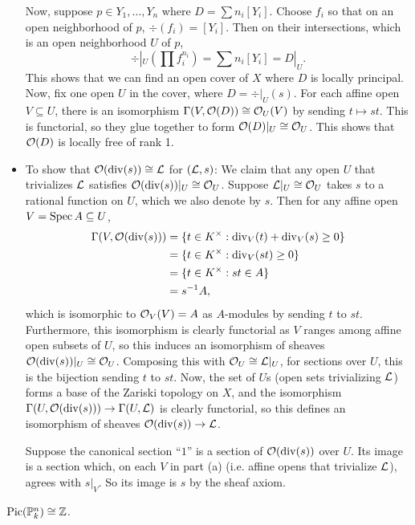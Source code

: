 \documentclass[11pt]{amsart}
\begin{document}
\begin{itemize}
Now, suppose $p\in Y_1,\dots,Y_n$ where $D  = \sum n_i[Y_i]$. Choose $f_i$ so that on an open neighborhood of $p$, $\div(f_i) = [Y_i]$. Then on their intersections, which is an open neighborhood $U$ of $p$, 
\[\div|_U (\prod f_i^{n_i}) = \sum n_i[Y_i] = D|_U.\]
This shows that we can find an open cover of $X$ where $D$ is locally principal. Now, fix one open $U$ in the cover, where $D = \div|_U(s)$. For each affine open $V\subseteq U$, there is an isomorphism $\Gamma(V,\mathcal{O}(D)) \cong \mathcal{O}_U(V)$ by sending $t\mapsto st$. This is functorial, so they glue together to form $\mathcal{O}(D)|_U \cong\mathcal{O}_U$. This shows that $\mathcal{O}(D)$ is locally free of rank 1.
\item To show that $\mathcal{O}(\operatorname{div}(s)) \cong \mathcal{L}$ for $(\mathcal{L}, s)$: We claim that any open $U$ that trivializes $\mathcal{L}$ satisfies $\mathcal{O}(\operatorname{div}(s))|_U \cong \mathcal{O}_U$. Suppose $\mathcal{L}|_U \cong \mathcal{O}_U$ takes $s$ to a rational function on $U$, which we also denote by $s$. Then for any affine open $V = \operatorname{Spec} A\subseteq U$,
    \begin{align*}
    \Gamma(V, \mathcal{O}(\operatorname{div}(s))) &= \{t\in K^\times: \operatorname{div}_V(t) + \operatorname{div}_V(s) \ge 0\} \\
    &= \{t\in K^\times: \operatorname{div}_V(st) \ge 0\} \\
    &= \{t\in K^\times: st\in A\} \\
    &= s^{-1}A,
    \end{align*}
    which is isomorphic to $\mathcal{O}_V(V) = A$ as $A$-modules by sending $t$ to $st$. Furthermore, this isomorphism is clearly functorial as $V$ ranges among affine open subsets of $U$, so this induces an isomorphism of sheaves $\mathcal{O}(\operatorname{div}(s))|_U \cong \mathcal{O}_U$. Composing this with $\mathcal{O}_U \cong \mathcal{L}|_U$, for sections over $U$, this is the bijection sending $t$ to $st$. Now, the set of $U$s (open sets trivializing $\mathcal{L}$) forms a base of the Zariski topology on $X$, and the isomorphism $\Gamma(U, \mathcal{O}(\operatorname{div}(s))) \to \Gamma(U, \mathcal{L})$ is clearly functorial, so this defines an isomorphism of sheaves $\mathcal{O}(\operatorname{div}(s))\to \mathcal{L}$.

    Suppose the canonical section ``$1$'' is a section of $\mathcal{O}(\operatorname{div}(s))$ over $U$. Its image is a section which, on each $V$ in part (a) (i.e. affine opens that trivialize $\mathcal{L}$), agrees with $s|_V$. So its image is $s$ by the sheaf axiom.
\end{itemize}


\begin{cor}
    $\operatorname{Pic}(\mathbb{P}_k^n) \cong \mathbb{Z}$.
\end{cor}
\end{document}
